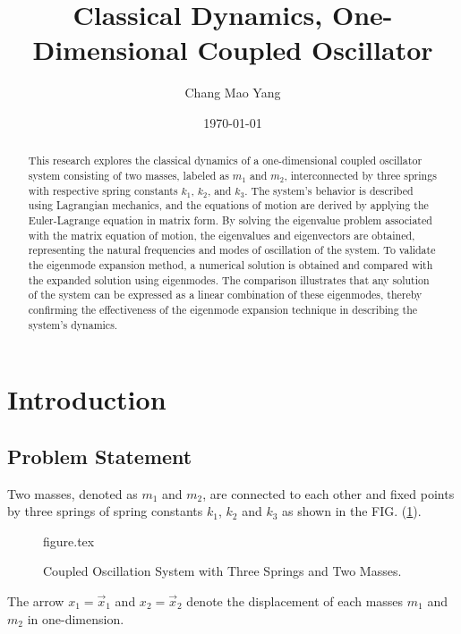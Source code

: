 \documentclass[a4paper, reprint, showkeys, nofootinbib,twoside]{revtex4-1}
\begin{document}
	\title{Classical Dynamics, One-Dimensional Coupled Oscillator}
	\author{Chang Mao Yang}
	\date{\today}
	
	\begin{abstract}
	This research explores the classical dynamics of a one-dimensional coupled oscillator system consisting of two masses, labeled as $m_1$ and $m_2$, interconnected by three springs with respective spring constants $k_1$, $k_2$, and $k_3$. The system's behavior is described using Lagrangian mechanics, and the equations of motion are derived by applying the Euler-Lagrange equation in matrix form. By solving the eigenvalue problem associated with the matrix equation of motion, the eigenvalues and eigenvectors are obtained, representing the natural frequencies and modes of oscillation of the system. To validate the eigenmode expansion method, a numerical solution is obtained and compared with the expanded solution using eigenmodes. The comparison illustrates that any solution of the system can be expressed as a linear combination of these eigenmodes, thereby confirming the effectiveness of the eigenmode expansion technique in describing the system's dynamics.
	\end{abstract}
	
	
	\maketitle
	\section{Introduction}
	\subsection{Problem Statement}
	Two masses, denoted as $m_1$ and $m_2$, are connected to each other and fixed points by three springs of spring constants $k_1$, $k_2$ and $k_3$ as shown in the FIG. (\ref{fig:system}).
	\begin{figure}[h]
		\centering
		{figure.tex}
		\caption{Coupled Oscillation System with Three Springs and Two Masses.}
		\label{fig:system}
        \end{figure}
        The arrow $x_1=\vec{x}_1$ and $x_2=\vec{x}_2$ denote the displacement of each masses $m_1$ and $m_2$ in one-dimension. 
\end{document}

